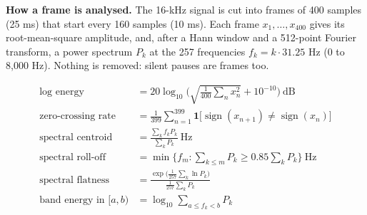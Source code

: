 \documentclass[11pt,a4paper]{article}
\begin{document}
\textbf{How a frame is analysed.} The 16-kHz signal is cut into frames of 400 samples (25 ms) that start every 160 samples (10 ms). Each frame $x_1,\dots,x_{400}$ gives its root-mean-square amplitude, and, after a Hann window and a 512-point Fourier transform, a power spectrum $P_k$ at the 257 frequencies $f_k = k \cdot 31.25$ Hz (0 to 8,000 Hz). Nothing is removed: silent pauses are frames too.

\begin{align*}
\text{log energy} &= 20\log_{10}\!\Big(\sqrt{\tfrac{1}{400}\textstyle\sum_{n} x_n^2}+10^{-10}\Big)\ \text{dB}\\[3pt]
\text{zero-crossing rate} &= \tfrac{1}{399}\textstyle\sum_{n=1}^{399}\mathbf{1}\big[\operatorname{sign}(x_{n+1})\neq\operatorname{sign}(x_n)\big]\\[3pt]
\text{spectral centroid} &= \frac{\sum_k f_k P_k}{\sum_k P_k}\ \text{Hz}\\[3pt]
\text{spectral roll-off} &= \min\Big\{f_m : \textstyle\sum_{k\le m}P_k \ge 0.85\sum_k P_k\Big\}\ \text{Hz}\\[3pt]
\text{spectral flatness} &= \frac{\exp\big(\frac{1}{257}\sum_k \ln P_k\big)}{\frac{1}{257}\sum_k P_k}\\[3pt]
\text{band energy in }[a,b) &= \log_{10}\textstyle\sum_{a\le f_k<b} P_k
\end{align*}
\end{document}
